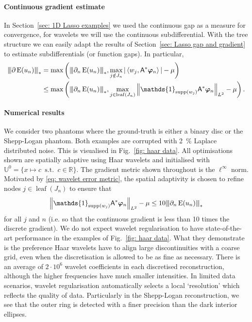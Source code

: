 \documentclass[smallextended]{svjour3}
\let\F\mathds\let\C\mathcal\newcommand{\R}{\F{R}}\newcommand{\A}{\tens{A}}
\newcommand{\norm}[1]{{\left\lVert #1 \right\rVert}}
\newcommand{\Norm}[1]{{\left\vert\kern-0.25ex\left\vert\kern-0.25ex\left\vert #1 \right\vert\kern-0.25ex\right\vert\kern-0.25ex\right\vert}}
\newcommand{\IP}[2]{\left\langle #1,#2 \right\rangle}
\newcommand{\op}[1]{\operatorname{#1}}
\newcommand{\1}{\F{1}}
\DeclareMathOperator{\st}{\;s.t.\;}
\DeclareMathOperator{\supp}{supp}
\newcommand*{\var}[1]{%
	\IfEqCase{#1}{%
		{0}{u}%
		{1}{v}%
		{2}{w}%
	}[u#1]%
}
\begin{document}
	\paragraph{Continuous gradient estimate}
	In Section~\ref{sec: 1D Lasso examples} we used the continuous gap as a measure for convergence, for wavelets we will use the continuous subdifferential. With the tree structure we can easily adapt the results of Section~\ref{sec: Lasso gap and gradient} to estimate subdifferentials (or function gaps). In particular,
	\begin{align}
		\Norm{\partial \op{E}(\var0_n)}_* &=\max\left(\Norm{\partial_n\op{E}(\var0_n)}_*, \max_{j\notin J_n} |\IP{w_j}{\A^*\vec{\varphi}_n}| -\mu \right) \\&\leq\max\left(\Norm{\partial_n\op{E}(\var0_n)}_*, \max_{j\in \op{leaf}(J_n)} \norm{\1_{\supp(w_j)}\A^*\vec{\varphi}_n}_{L^2} -\mu \right).\label{eq: wavelet error metric}
	\end{align}
	
	\paragraph{Numerical results}
	We consider two phantoms where the ground-truth is either a binary disc or the Shepp-Logan phantom. Both examples are corrupted with \SI{2}{\percent} Laplace distributed noise. This is visualised in Fig.~\ref{fig: haar data}. All optimisations shown are spatially adaptive using Haar wavelets and initialised with $\F{U}^0= \{x\mapsto c\st c\in\F R\}$. The gradient metric shown throughout is the $\ell^\infty$ norm. Motivated by \eqref{eq: wavelet error metric}, the spatial adaptivity is chosen to refine nodes $j\in\op{leaf}(J_n)$ to ensure that 
	$$ \norm{\1_{\supp(w_j)}\A^*\vec{\varphi}_n}_{L^2} -\mu  \leq 10\Norm{\partial_n\op{E}(\var0_n)}_*$$
	for all $j$ and $n$ (i.e. so that the continuous gradient is less than 10 times the discrete gradient).
	We do not expect wavelet regularisation to have state-of-the-art performance in the examples of Fig.~\ref{fig: haar data}. What they demonstrate is the preference Haar wavelets have to align large discontinuities with a coarse grid, even when the discretisation is allowed to be as fine as necessary. There is an average of $2\cdot10^6$ wavelet coefficients in each discretised reconstruction, although the higher frequencies have much smaller intensities. In limited data scenarios, wavelet regularisation automatically selects a local `resolution' which reflects the quality of data. Particularly in the Shepp-Logan reconstruction, we see that the outer ring is detected with a finer precision than the dark interior ellipses.
	
\end{document}
